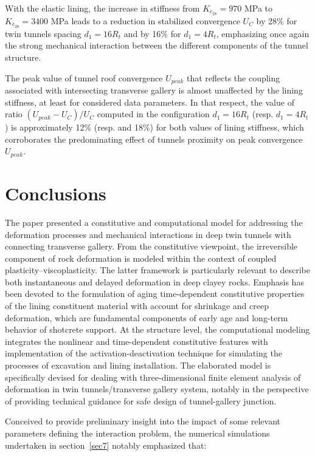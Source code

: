 \documentclass[a4paper,fleqn]{cas-sc}
\begin{document}
With the elastic lining, the increase in stiffness from $K_{c_{28}}=970$ MPa to $K_{c_{28}}=3400$ MPa leads to a reduction in stabilized convergence $U_C$ by 28\% for twin tunnels spacing  $d_1=16R_t$ and by 16\% for $d_1=4R_t$, emphasizing once again the strong mechanical interaction between the different components of the tunnel structure.

The peak value of tunnel roof convergence $U_{peak}$ that reflects the coupling associated with intersecting transverse gallery is almost unaffected by the lining stiffness, at least for considered data parameters. In that respect, the value of ratio $(U_{peak}-U_C)/U_C$ computed in the configuration $d_1=16R_t$ (resp. $d_1=4R_t$) is  approximately 12\% (resp. and 18\%) for both values of lining stiffness, which corroborates the predominating effect of tunnels proximity on peak convergence $U_{peak}$. 

\section{Conclusions}\label{}

The paper presented a constitutive and computational model for addressing the deformation processes and mechanical interactions in deep twin tunnels with connecting transverse gallery. From the constitutive viewpoint, the irreversible component of rock deformation is modeled within the context of coupled plasticity–viscoplasticity. The latter framework is particularly relevant to describe both instantaneous and delayed deformation in deep clayey rocks. Emphasis has been devoted to the formulation of aging time-dependent constitutive properties of the lining constituent material with account for shrinkage and creep deformation, which are fundamental components of early age and long-term behavior of shotcrete support. At the structure level, the computational modeling integrates the nonlinear and time-dependent constitutive features with implementation of the activation-deactivation technique for simulating the processes of excavation and lining installation. The elaborated model is specifically devised for dealing with three-dimensional finite element analysis of deformation in twin tunnels/transverse gallery system, notably in the perspective of providing technical guidance for safe design of tunnel-gallery junction.

Conceived to provide preliminary insight into the impact of some relevant parameters defining the interaction problem, the numerical simulations undertaken in section~\ref{sec7} notably emphasized that:
\end{document}
